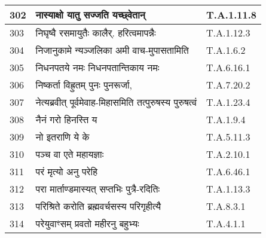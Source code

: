 \documentclass[17pt]{extarticle}
\begin{document}
\begin{longtable}{||p{0.4in}||p{4.9in}||p{0.9in}||}
    \hline
        
    302 & नास्याक्षो यातु सज्जति यच्छ्वेतान् & T.A.1.11.8       \\
    
    \hline
        
    303 & निघृष्वै रसमायुतैः कालैर्. हरित्वमापन्नैः & T.A.1.12.3       \\
    
    \hline
        
    304 & निजानुकामे न्यञ्जलिका अमी वाच{-}मुपासतामिति & T.A.1.6.2       \\
    
    \hline
        
    305 & निधनपतये नमः निधनपतान्तिकाय नमः & T.A.6.16.1       \\
    
    \hline
        
    306 & निष्कर्ता विह्रुतम् पुनः पुनरूर्जा, & T.A.7.20.2       \\
    
    \hline
        
    307 & नेत्यब्रवीत् पूर्वमेवाह{-}मिहासमिति तत्पुरुषस्य पुरुषत्वं & T.A.1.23.4       \\
    
    \hline
        
    308 & नैनं गरो हिनस्ति य & T.A.1.9.4       \\
    
    \hline
        
    309 & नो इतराणि ये के & T.A.5.11.3       \\
    
    \hline
        
    310 & पञ्च वा एते महायज्ञाः & T.A.2.10.1       \\
    
    \hline
        
    311 & परं मृत्यो अनु परेहि & T.A.6.46.1       \\
    
    \hline
        
    312 & परा मार्ताण्डमास्यत् सप्तभिः पुत्रै{-}रदितिः & T.A.1.13.3       \\
    
    \hline
        
    313 & परिश्रिते करोति ब्रह्मवर्चसस्य परिगृहीत्यै & T.A.8.3.1       \\
    
    \hline
        
    314 & परेयुवाꣳसम् प्रवतो महीरनु बहुभ्यः & T.A.4.1.1       \\
    

\end{longtable}
\end{document}

